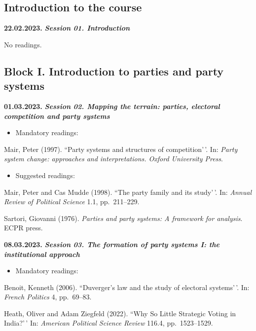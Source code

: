 \documentclass[
  12pt,
]{article}
\providecommand{\tightlist}{%
  \setlength{\itemsep}{0pt}\setlength{\parskip}{0pt}}
\begin{document}
\hypertarget{introduction-to-the-course}{%
\subsection{Introduction to the
course}\label{introduction-to-the-course}}

\textbf{22.02.2023.} \textbf{\emph{Session 01. Introduction}}

No readings.

\hypertarget{block-i.-introduction-to-parties-and-party-systems}{%
\subsection{Block I. Introduction to parties and party
systems}\label{block-i.-introduction-to-parties-and-party-systems}}

\textbf{01.03.2023.} \textbf{\emph{Session 02. Mapping the terrain:
parties, electoral competition and party systems}}

\begin{itemize}
\tightlist
\item
  Mandatory readings:
\end{itemize}

Mair, Peter (1997). ``Party systems and structures of competition'\,'.
In:
\emph{Party system change: approaches and interpretations. Oxford University Press}.

\begin{itemize}
\tightlist
\item
  Suggested readings:
\end{itemize}

Mair, Peter and Cas Mudde (1998). ``The party family and its study'\,'.
In: \emph{Annual Review of Political Science} 1.1, pp.~211--229.

Sartori, Giovanni (1976).
\emph{Parties and party systems: A framework for analysis}. ECPR press.

\textbf{08.03.2023.} \textbf{\emph{Session 03. The formation of party
systems I: the institutional approach}}

\begin{itemize}
\tightlist
\item
  Mandatory readings:
\end{itemize}

Benoit, Kenneth (2006). ``Duverger's law and the study of electoral
systems'\,'. In: \emph{French Politics} 4, pp.~69--83.

Heath, Oliver and Adam Ziegfeld (2022). ``Why So Little Strategic Voting
in India?'\,' In: \emph{American Political Science Review} 116.4,
pp.~1523--1529.
\end{document}
